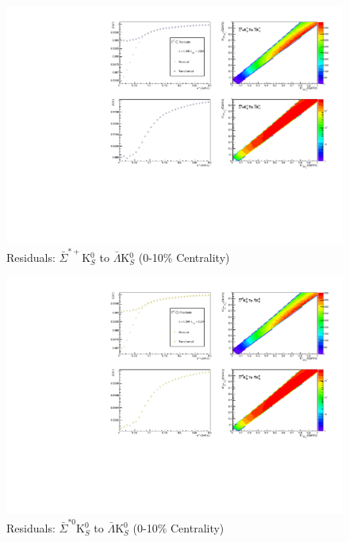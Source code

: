 \documentclass[../AnalysisNoteJBuxton.tex]{subfiles}
\begin{document}
\begin{figure}[h]
  \centering
  \includegraphics[width=\textwidth]{9_AdditionalFigures/Figures/Residuals/ALamK0/Residuals_ALamK0_0010_ASigStPK0_MomResCrctn_NonFlatBgdCrctn_SingleLamParam_ResidualsIncluded_UsingCoulombOnlyInterpCfs.pdf}
  \caption[Residuals: $\bar{\Sigma}^{*+}$K$^{0}_{S}$ to $\bar{\Lambda}$K$^{0}_{S}$ (0-10\% Centrality)]{Residuals: $\bar{\Sigma}^{*+}$K$^{0}_{S}$ to $\bar{\Lambda}$K$^{0}_{S}$ (0-10\% Centrality)}
  \label{fig:Res_ALamK0_0010_ASigStPK0}
\end{figure}

\begin{figure}[h]
  \centering
  \includegraphics[width=\textwidth]{9_AdditionalFigures/Figures/Residuals/ALamK0/Residuals_ALamK0_0010_ASigSt0K0_MomResCrctn_NonFlatBgdCrctn_SingleLamParam_ResidualsIncluded_UsingCoulombOnlyInterpCfs.pdf}
  \caption[Residuals: $\bar{\Sigma}^{*0}$K$^{0}_{S}$ to $\bar{\Lambda}$K$^{0}_{S}$ (0-10\% Centrality)]{Residuals: $\bar{\Sigma}^{*0}$K$^{0}_{S}$ to $\bar{\Lambda}$K$^{0}_{S}$ (0-10\% Centrality)}
  \label{fig:Res_ALamK0_0010_ASigSt0K0}
\end{figure}
\end{document}

